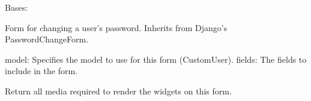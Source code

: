 \documentclass[letterpaper,10pt,english]{sphinxmanual}
\begin{document}

\begin{fulllineitems}
\label{\detokenize{modules/forms:account.forms.UserPasswordChangeForm}}
\pysigstartsignatures
{}
\pysigstopsignatures
\sphinxAtStartPar
Bases: 

\sphinxAtStartPar
Form for changing a user’s password. Inherits from Django’s PasswordChangeForm.
\begin{description}
\sphinxAtStartPar
model: Specifies the model to use for this form (CustomUser).
fields: The fields to include in the form.

\end{description}

\begin{fulllineitems}
\label{\detokenize{modules/forms:account.forms.UserPasswordChangeForm.media}}
\pysigstartsignatures
{}
\pysigstopsignatures
\sphinxAtStartPar
Return all media required to render the widgets on this form.

\end{fulllineitems}


\end{fulllineitems}

\end{document}
